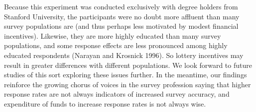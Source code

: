 \documentclass[12pt]{article}
\begin{document}
	Because this experiment was conducted exclusively with degree holders from Stanford University, the participants were no doubt more affluent than many survey populations are (and thus perhaps less motivated by modest financial incentives).  Likewise, they are more highly educated than many survey populations, and some response effects are less pronounced among highly educated respondents (Narayan and Krosnick 1996).  So lottery incentives may result in greater differences with different populations.  We look forward to future studies of this sort exploring these issues further.  In the meantime, our findings reinforce the growing chorus of voices in the survey profession saying that higher response rates are not always indicators of increased survey accuracy, and expenditure of funds to increase response rates is not always wise.  



\end{document}
